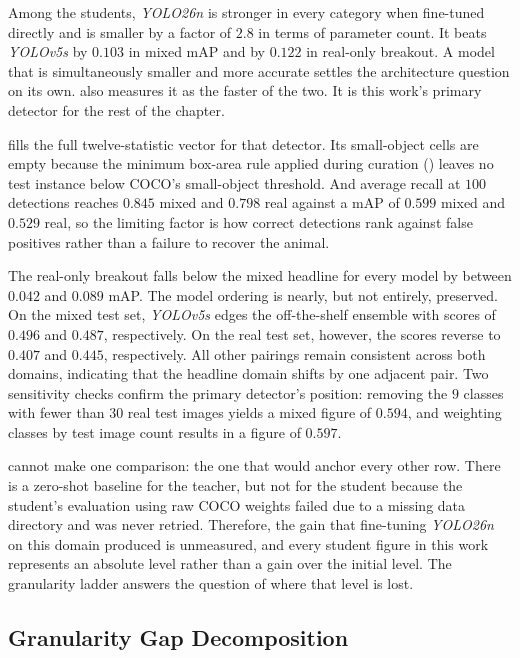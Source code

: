 Among the students, \textit{YOLO26n} is stronger in every category when fine-tuned directly and is smaller by a factor of $2.8$ in terms of parameter count. It beats \textit{YOLOv5s} by $0.103$ in mixed mAP and by $0.122$ in real-only breakout. A model that is simultaneously smaller and more accurate settles the architecture question on its own.  also measures it as the faster of the two. It is this work's primary detector for the rest of the chapter.

 fills the full twelve-statistic vector for that detector. Its small-object cells are empty because the minimum box-area rule applied during curation () leaves no test instance below COCO's small-object threshold. And average recall at $100$ detections reaches $0.845$ mixed and $0.798$ real against a mAP of $0.599$ mixed and $0.529$ real, so the limiting factor is how correct detections rank against false positives rather than a failure to recover the animal.

The real-only breakout falls below the mixed headline for every model by between $0.042$ and $0.089$ mAP. The model ordering is nearly, but not entirely, preserved. On the mixed test set, \textit{YOLOv5s} edges the off-the-shelf ensemble with scores of $0.496$ and $0.487$, respectively. On the real test set, however, the scores reverse to $0.407$ and $0.445$, respectively. All other pairings remain consistent across both domains, indicating that the headline domain shifts by one adjacent pair. Two sensitivity checks confirm the primary detector's position: removing the $9$ classes with fewer than $30$ real test images yields a mixed figure of $0.594$, and weighting classes by test image count results in a figure of $0.597$.

 cannot make one comparison: the one that would anchor every other row. There is a zero-shot baseline for the teacher, but not for the student because the student's evaluation using raw COCO weights failed due to a missing data directory and was never retried. Therefore, the gain that fine-tuning \textit{YOLO26n} on this domain produced is unmeasured, and every student figure in this work represents an absolute level rather than a gain over the initial level. The granularity ladder answers the question of where that level is lost.

\subsection{Granularity Gap Decomposition}\label{sec:results_granularity_gaps}

